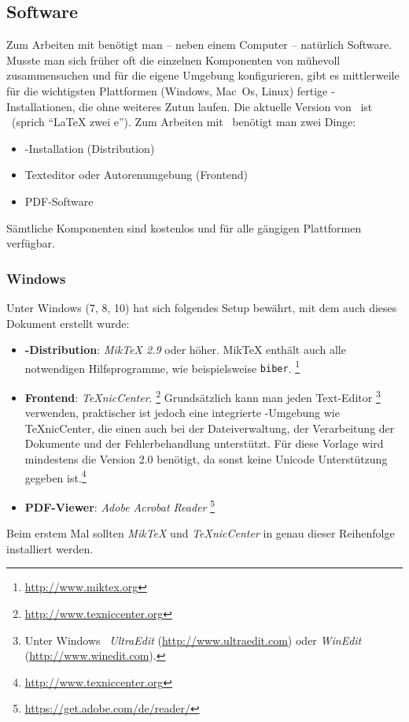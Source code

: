 \subsection{Software}

Zum Arbeiten mit \latex benötigt man -- neben einem Computer -- natürlich Software. Musste man sich früher oft die einzelnen Komponenten von \latex mühevoll zusammensuchen und für die eigene Umgebung konfigurieren, gibt es mittlerweile für die wichtigsten Plattformen (Windows, Mac~Os, Linux) fertige \latex-Installationen, die ohne weiteres Zutun laufen. Die aktuelle Version von \latex\ ist \LaTeXe\ (sprich "`LaTeX zwei e"'). 
Zum Arbeiten mit \latex\ benötigt man zwei Dinge:
%
\begin{itemize}
\item \latex-Installation (Distribution)
\item Texteditor oder Autorenumgebung (Frontend)
\item PDF-Software 
\end{itemize}
%
Sämtliche Komponenten sind kostenlos und für alle gängigen Plattformen verfügbar.


\subsubsection{Windows}

Unter \gls{Windows} (7, 8, 10) hat sich folgendes Setup bewährt,
mit dem \ua auch dieses Dokument erstellt wurde:
%
\begin{itemize}
\item \textbf{\latex-Distribution}: \emph{MikTeX 2.9} oder höher.
MikTeX enthält auch alle notwendigen Hilfsprogramme, wie beispielsweise {\tt biber}.%
\footnote{\url{http://www.miktex.org}}
\item \textbf{Frontend}: \emph{TeXnicCenter}.%
\footnote{\url{http://www.texniccenter.org}}
Grundsätzlich kann man jeden Text-Editor%
\footnote{Unter Windows \zB\ \emph{Ultra\-Edit} (\url{http://www.ultraedit.com})
oder \emph{WinEdit} (\url{http://www.winedit.com}).} verwenden, praktischer ist jedoch eine integrierte \latex-Umgebung wie TeXnicCenter, die einen auch bei 
der Dateiverwaltung, der Verarbeitung der Dokumente und der Fehlerbehandlung unterstützt. Für diese Vorlage wird mindestens die Version 2.0 benötigt, da sonst keine Unicode Unterstützung gegeben ist.\footnote{\url{http://www.texniccenter.org}}
\item \textbf{PDF-Viewer}: \emph{Adobe Acrobat Reader}%
\footnote{\url{https://get.adobe.com/de/reader/}}
\end{itemize}
Beim erstem Mal sollten \emph{MikTeX} und \emph{TeXnicCenter} in genau dieser Reihenfolge installiert werden.

